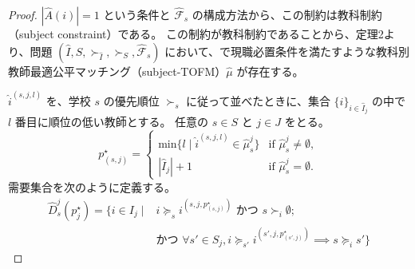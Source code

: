 \documentclass[12pt, a4paper]{article}
\theoremstyle{definition}
\theoremstyle{remark}
\theoremstyle{plain}
\begin{document}
\begin{proof}


$|\widehat{A}(i)| = 1$ という条件と $\widehat{\mathcal{F}}_s$ の構成方法から、この制約は教科制約（subject constraint）である。
この制約が教科制約であることから、定理2より、問題 $(\widehat{I},S,\succ_{\widehat{I}},\succ_S,\widehat{\mathcal{F}}_s)$ において、で現職必置条件を満たすような教科別教師最適公平マッチング（subject-TOFM）$\widehat{\mu}$ が存在する。

$\widehat{i}^{(s,j,l)}$ を、学校 $s$ の優先順位 $\succ_s$ に従って並べたときに、集合 $\{i\}_{i \in \widehat{I}_j}$ の中で $l$ 番目に順位の低い教師とする。
任意の $s \in S$ と $j \in J$ をとる。
\[
p_{(s,j)}^\star =
\begin{cases}
\text{min} \{l \mid \widehat{i}^{(s,j,l)} \in \widehat{\mu}_s^j \} & \text{if } \widehat{\mu}_s^j \neq \emptyset, \\
|\widehat{I}_j| + 1      & \text{if } \widehat{\mu}_s^j = \emptyset.
\end{cases}
\]
需要集合を次のように定義する。
\begin{align*}
\widehat{D}^j_s(p^\star_j) = \{ i \in I_j \mid & i \succeq_s i^{(s,j,p^\star_{(s,j)})} \text{ かつ } s \succ_i \emptyset; \\
& \text{かつ } \forall s' \in S_j, i \succeq_{s'} i^{(s',j,p^\star_{(s',j)})} \implies s \succeq_i s' \}
\end{align*}




\end{proof}
\end{document}
